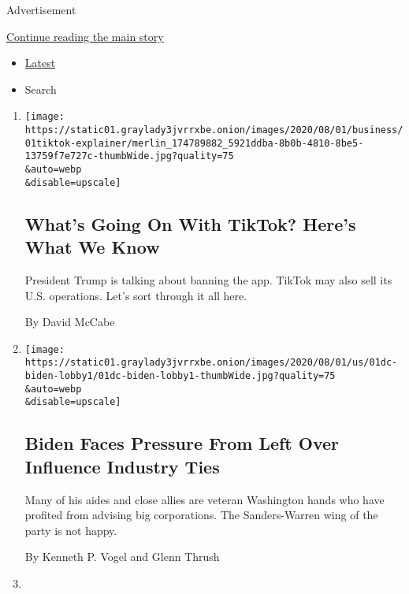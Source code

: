 Advertisement

\protect\hyperlink{after-mid1}{Continue reading the main story}

\begin{itemize}
\tightlist
\item
  \protect\hyperlink{stream-panel}{Latest}
\item
  Search
\end{itemize}

\begin{enumerate}
\def\labelenumi{\arabic{enumi}.}
\item
  \href{/2020/08/01/technology/tiktok-trump-microsoft-bytedance-china-ban.html}{}

  \texttt{[image: https://static01.graylady3jvrrxbe.onion/images/2020/08/01/business/01tiktok-explainer/merlin\_174789882\_5921ddba-8b0b-4810-8be5-13759f7e727c-thumbWide.jpg?quality=75\\\&auto=webp\\\&disable=upscale]}

  \hypertarget{whats-going-on-with-tiktok-heres-what-we-know}{%
  \subsection{What's Going On With TikTok? Here's What We
  Know}\label{whats-going-on-with-tiktok-heres-what-we-know}}

  President Trump is talking about banning the app. TikTok may also sell
  its U.S. operations. Let's sort through it all here.

  By David McCabe
\item
  \href{/2020/08/01/us/politics/biden-lobbyist-ties.html}{}

  \texttt{[image: https://static01.graylady3jvrrxbe.onion/images/2020/08/01/us/01dc-biden-lobby1/01dc-biden-lobby1-thumbWide.jpg?quality=75\\\&auto=webp\\\&disable=upscale]}

  \hypertarget{biden-faces-pressure-from-left-over-influence-industry-ties}{%
  \subsection{Biden Faces Pressure From Left Over Influence Industry
  Ties}\label{biden-faces-pressure-from-left-over-influence-industry-ties}}

  Many of his aides and close allies are veteran Washington hands who
  have profited from advising big corporations. The Sanders-Warren wing
  of the party is not happy.

  By Kenneth P. Vogel and Glenn Thrush
\item
  \href{/2020/08/01/us/eid-al-adha-coronavirus.html}{}


\end{enumerate}
